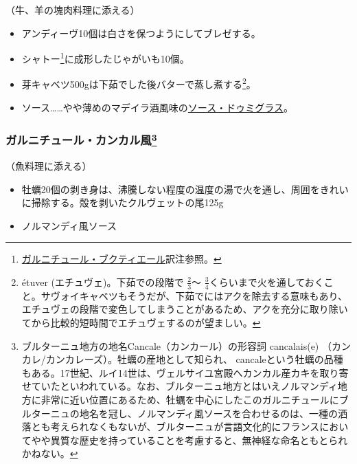 \begin{recette}
（牛、羊の塊肉料理に添える）

\begin{itemize}
\item
  アンディーヴ10個は白さを保つようにしてブレゼする。
\item
  シャトー\footnote{\protect\hyperlink{garniture-bouquetiere}{ガルニチュール・ブクティエール}訳注参照。}に成形したじゃがいも10個。
\item
  芽キャベツ500gは下茹でした後バターで蒸し煮する\footnote{étuver
    (エチュヴェ)。下茹での段階で \(\frac{2}{3}\)〜
    \(\frac{3}{4}\)くらいまで火を通しておくこと。サヴォイキャベツもそうだが、下茹でにはアクを除去する意味もあり、エチュヴェの段階で変色してしまうことがあるため、アクを充分に取り除いてから比較的短時間でエチュヴェするのが望ましい。}。
\item
  ソース\ldots{}\ldots{}やや薄めのマデイラ酒風味の\protect\hyperlink{sauce-demi-glace}{ソース・ドゥミグラス}。
\end{itemize}

\hypertarget{garniture-cancalaise}{%
\subsubsection[ガルニチュール・カンカル風]{\texorpdfstring{ガルニチュール・カンカル風\footnote{ブルターニュ地方の地名Cancale（カンカール）の形容詞
  cancalais(e) （カンカレ/カンカレーズ）。牡蠣の産地として知られ、
  cancaleという牡蠣の品種もある。17世紀、ルイ14世は、ヴェルサイユ宮殿へカンカル産カキを取り寄せていたといわれている。なお、ブルターニュ地方とはいえノルマンディ地方に非常に近い位置にあるため、牡蠣を中心にしたこのガルニチュールにブルターニュの地名を冠し、ノルマンディ風ソースを合わせるのは、一種の洒落とも考えられなくもないが、ブルターニュが言語文化的にフランスにおいてやや異質な歴史を持っていることを考慮すると、無神経な命名ともとられかねない。}}{ガルニチュール・カンカル風}}\label{garniture-cancalaise}}



（魚料理に添える）

\begin{itemize}
\item
  牡蠣20個の剥き身は、沸騰しない程度の温度の湯で火を通し、周囲をきれいに掃除する。殻を剥いたクルヴェットの尾125g
\item
  ノルマンディ風ソース
\end{itemize}


\end{recette}

